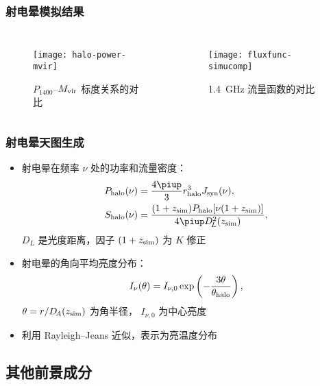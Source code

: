 \documentclass{beamer}
\begin{document}
\begin{frame}[subsec]
  \frametitle{射电晕模拟结果}
  \begin{columns}
    \begin{figure}
      \centering
      \texttt{[image: halo-power-mvir]}
      \caption{$P_{1400}$--$M_{\text{vir}}$ 标度关系的对比}
    \end{figure}

    \begin{figure}
      \centering
      \texttt{[image: fluxfunc-simucomp]}
      \caption{\SI{1.4}{\GHz} 流量函数的对比}
    \end{figure}
  \end{columns}
\end{frame}

\begin{frame}[subsec]
  \frametitle{射电晕天图生成}
  \begin{itemize}
    \item 射电晕在频率 $\nu$ 处的功率和流量密度：
      \begin{align}
        P_{\R{halo}}(\nu)
          & = \frac{4\Cpi}{3} r^3_{\R{halo}} J_{\R{syn}}(\nu) , \\
        S_{\R{halo}}(\nu)
          & = \frac{(1+z_{\R{sim}}) P_{\R{halo}}[\nu (1+z_{\R{sim}})]}{
            4\Cpi D^2_{\!L}(z_{\R{sim}})} ,
      \end{align}
      $D_{\!L}$ 是光度距离，因子 $(1+z_{\text{sim}})$ 为 $K$ 修正
    \item 射电晕的角向平均亮度分布：
      \begin{equation}
        I_{\nu}(\theta) = I_{\nu,0} \exp
          \left( -\frac{3\theta}{\theta_{\text{halo}}} \right) ,
      \end{equation}
      $\theta = r / D_{\!A}(z_{\text{sim}})$ 为角半径，
      $I_{\nu,0}$ 为中心亮度
    \item 利用 Rayleigh--Jeans 近似，表示为亮温度分布
  \end{itemize}
\end{frame}

\subsection{其他前景成分}
\end{document}
